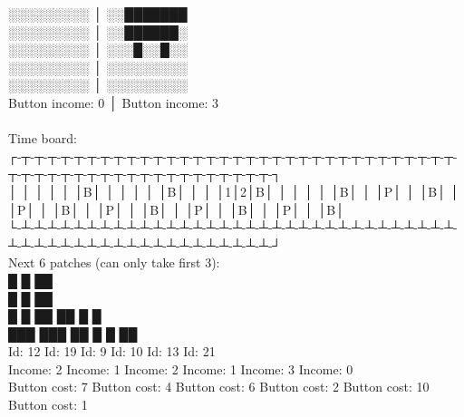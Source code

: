 {░░░░░░░░░                    │ ░░███████                                                                      \\
░░░░░░░░░                    │ ░░██████░                                                                      \\
░░░░░░░░░                    │ ░░░█░░█░░                                                                      \\
░░░░░░░░░                    │ ░░░░░░░░░                                                                      \\
░░░░░░░░░                    │ ░░░░░░░░░                                                                      \\
Button income: 0             │ Button income: 3                                                               \\
\\
Time board:                                                                                                   \\
┌-┬-┬-┬-┬-┬-┬-┬-┬-┬-┬-┬-┬-┬-┬-┬-┬-┬-┬-┬-┬-┬-┬-┬-┬-┬-┬-┬-┬-┬-┬-┬-┬-┬-┬-┬-┬-┬-┬-┬-┬-┬-┬-┬-┬-┬-┬-┬-┬-┬-┬-┬-┬-┬-┐ \\
│ │ │ │ │ │B│ │ │ │ │ │B│ │ │ │1│2│B│ │ │ │ │ │B│ │ │P│ │ │B│ │ │P│ │ │B│ │ │P│ │ │B│ │ │P│ │ │B│ │ │P│ │ │B│ \\
└-┴-┴-┴-┴-┴-┴-┴-┴-┴-┴-┴-┴-┴-┴-┴-┴-┴-┴-┴-┴-┴-┴-┴-┴-┴-┴-┴-┴-┴-┴-┴-┴-┴-┴-┴-┴-┴-┴-┴-┴-┴-┴-┴-┴-┴-┴-┴-┴-┴-┴-┴-┴-┴-┘ \\
Next 6 patches (can only take first 3): \\
█                                                     █                ██  \\
█                                                     █                ██  \\
█                  █               ██                ██                 █                  █  \\
███               ███               ██                █                  █                 ██  \\
Id: 12            Id: 19            Id: 9             Id: 10            Id: 13             Id: 21  \\
Income: 2         Income: 1         Income: 2         Income: 1         Income: 3          Income: 0  \\
Button cost: 7    Button cost: 4    Button cost: 6    Button cost: 2    Button cost: 10    Button cost: 1  \\
}
